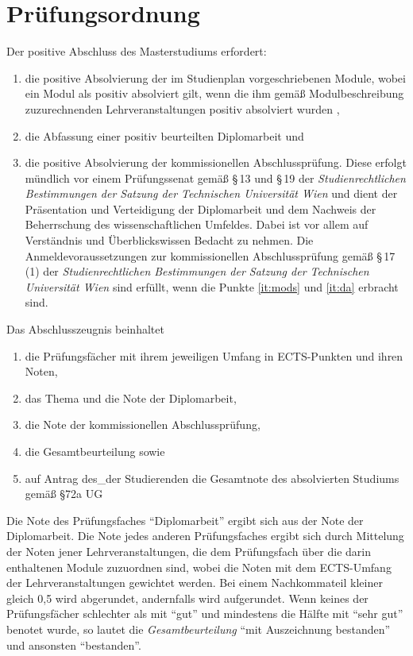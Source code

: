 \section{Prüfungsordnung}\label{sec:PO}

Der positive Abschluss des Masterstudiums erfordert:
\begin{enumerate}
\item \label{it:mods} die positive Absolvierung der im
  Studienplan vorgeschriebenen Module, wobei ein Modul als positiv
  absolviert gilt, wenn die ihm gemäß Modulbeschreibung zuzurechnenden
  Lehrveranstaltungen positiv absolviert wurden%
  ,
\item \label{it:da} die Abfassung einer positiv beurteilten Diplomarbeit%
   und
\item die positive Absolvierung der kommissionellen
  Abschlussprüfung. Diese erfolgt mündlich vor einem Prüfungssenat
  gemäß \S\,13 und \S\,19 der \emph{Studienrechtlichen Bestimmungen
  der Satzung der Technischen Universität Wien} und dient der
  Präsentation und Verteidigung der Diplomarbeit und dem Nachweis der
  Beherrschung des wissenschaftlichen Umfeldes. Dabei ist vor allem
  auf Verständnis und Überblickswissen Bedacht zu nehmen. Die
  Anmelde\-voraussetzungen zur kommissionellen Abschlussprüfung gemäß
  \S\,17\,(1) der \emph{Studienrechtlichen Bestimmungen der Satzung
  der Technischen Universität Wien} sind erfüllt, wenn die Punkte
  \ref{it:mods} und \ref{it:da} erbracht sind.
\end{enumerate}
Das Abschlusszeugnis beinhaltet
\begin{enumerate}[label=(\alph*)]
\item \label{it:pfs} die Prüfungsfächer mit ihrem jeweiligen Umfang in
  ECTS-Punkten und ihren Noten,
\item das Thema und die Note der Diplomarbeit,
\item die Note der kommissionellen Abschlussprüfung,
\item die Gesamtbeurteilung sowie 
\item auf Antrag des\_der Studierenden die Gesamtnote des absolvierten 
Studiums gemäß §72a UG%
%
\end{enumerate}
Die Note des Prüfungsfaches "`Diplomarbeit"' ergibt sich aus der 
Note der Diplomarbeit. Die Note jedes anderen Prüfungsfaches 
ergibt sich durch Mittelung der Noten
jener Lehrveranstaltungen, die dem Prüfungsfach über die darin
enthaltenen Module zuzuordnen sind, wobei die Noten mit dem
ECTS-Umfang der Lehrveranstaltungen gewichtet werden. Bei einem
Nachkommateil kleiner gleich 0,5 wird abgerundet, andernfalls
wird aufgerundet. Wenn keines der Prüfungsfächer schlechter als mit 
"`gut"' und mindestens die Hälfte mit "`sehr gut"' benotet wurde, so 
lautet die \emph{Gesamtbeurteilung} "`mit Auszeichnung bestanden"' 
und ansonsten "`bestanden"'. 

